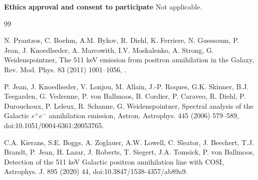 \documentclass[11pt]{article}
\begin{document}
\textbf{Ethics approval and consent to participate} Not applicable.

\begin{thebibliography}{99}

N. Prantzos, C. Boehm, A.M. Bykov, R. Diehl, K. Ferriere, N. Guessoum, P. Jean, J. Knoedlseder, A. Marcowith, I.V. Moskalenko, A. Strong, G. Weidenspointner, The 511 keV emission from positron annihilation in the Galaxy, Rev. Mod. Phys. 83 (2011) 1001--1056, .

P. Jean, J. Knoedlseder, V. Lonjou, M. Allain, J.-P. Roques, G.K. Skinner, B.J. Teegarden, G. Vedrenne, P. von Ballmoos, B. Cordier, P. Caraveo, R. Diehl, P. Durouchoux, P. Leleux, R. Schanne, G. Weidenspointner, Spectral analysis of the Galactic $e^+e^-$ annihilation emission, Astron. Astrophys. 445 (2006) 579--589, doi:10.1051/0004-6361:20053765.

C.A. Kierans, S.E. Boggs, A. Zoglauer, A.W. Lowell, C. Sleator, J. Beechert, T.J. Brandt, P. Jean, H. Lazar, J. Roberts, T. Siegert, J.A. Tomsick, P. von Ballmoos, Detection of the 511 keV Galactic positron annihilation line with COSI, Astrophys. J. 895 (2020) 44, doi:10.3847/1538-4357/ab89a9.


\end{thebibliography}
\end{document}
